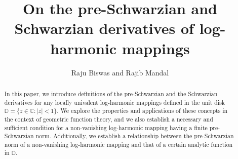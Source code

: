 \documentclass[12pt,reqno]{amsart}
\newtheorem{open problem}{Open problem}[section]
\numberwithin{equation}{section}
\begin{document}
\title[Pre-Schwarzian and Schwarzian derivatives]{On the pre-Schwarzian and Schwarzian derivatives of log-harmonic mappings}
\author[R. Biswas and R. Mandal]{Raju Biswas and Rajib Mandal}
\date{}
\address{Raju Biswas, Department of Mathematics, Raiganj University, Raiganj, West Bengal-733134, India.}
\address{Rajib Mandal, Department of Mathematics, Raiganj University, Raiganj, West Bengal-733134, India.}
\let\thefootnote\relax
{}
\begin{abstract}
In this paper, we introduce definitions of the pre-Schwarzian and the Schwarzian derivatives for any locally univalent log-harmonic mappings defined in the unit disk $\mathbb{D}=\{z\in\mathbb{C}: |z|<1\}$. We explore the properties and applications of these concepts in the context of geometric function theory, and we also establish a necessary and sufficient condition for a non-vanishing log-harmonic mapping having a finite pre-Schwarzian norm. Additionally, we establish a relationship between the pre-Schwarzian norm of a non-vanishing log-harmonic mapping and that of a certain analytic function in $\mathbb{D}$.
\end{abstract}
\maketitle
\end{document}
